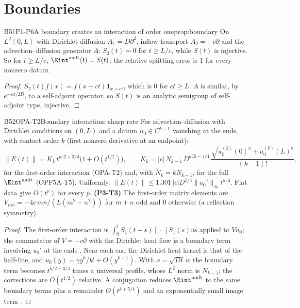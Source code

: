 \section{Boundaries}

\begin{dimcard}{B51}{P1-P6}{A boundary creates an interaction of order one}{\proved}{prop:boundary}
On $L^2(0,L)$ with Dirichlet diffusion $A_1=D\partial^2$, inflow transport $A_2=-c\partial$ and the advection--diffusion generator $A$: $S_2(t)=0$ for $t\ge L/c$, while $S(t)$ is injective. So for $t\ge L/c$, $\Eint^{\mathrm{mult}}(t)=S(t)$: the relative splitting error is $1$ for every nonzero datum.
\end{dimcard}
\begin{proof}
$S_2(t)f(x)=f(x-ct)\mathbf 1_{x>ct}$, which is $0$ for $ct\ge L$.
$A$ is similar, by $e^{-cx/2D}$, to a self-adjoint operator, so $S(t)$ is an analytic semigroup of self-adjoint type, injective.
\end{proof}

\begin{dimcard}{B52}{OPA-T2}{Boundary interaction: sharp rate}{\proved}{}
\label{dim:P3-T3}\label{dim:OPF5A-T5}%
For advection--diffusion with Dirichlet conditions on $(0,L)$ and a datum $u_0\in C^{k+1}$ vanishing at the ends, with contact order $k$ (first nonzero derivative at an endpoint):
\[
\|E(t)\|=K_k\,t^{k/2+3/4}\big(1+O(t^{1/2})\big),\qquad
K_k=|c|\,N_{k-1}\,D^{k/2-1/4}\,\frac{\sqrt{u_0^{(k)}(0)^2+u_0^{(k)}(L)^2}}{(k-1)!},
\]
for the first-order interaction (OPA-T2) and, with $\tilde N_k=kN_{k-1}$, for the full $\Eint^{\mathrm{mult}}$ (OPF5A-T5). Uniformly: $\|E(t)\|\le1.301\,|c|D^{1/4}\|u_0'\|_\infty t^{5/4}$. Flat data give $O(t^p)$ for every $p$. \textbf{(P3-T3)} The first-order matrix elements are $V_{mn}=-4c\,mn/(L(m^2-n^2))$ for $m+n$ odd and $0$ otherwise (a reflection symmetry).
\end{dimcard}
\begin{proof}
The first-order interaction is $\int_0^tS_1(t-s)[\,\cdot\,]S_1(s)\dd s$ applied to $Vu_0$; the commutator of $V=-c\partial$ with the Dirichlet heat flow is a boundary term involving $u_0'$ at the ends .
Near each end the Dirichlet heat kernel is that of the half-line, and $u_0(y)=\gamma y^k/k!+O(y^{k+1})$.
With $x=\sqrt{Dt}\,w$ the boundary term becomes $t^{k/2+3/4}$ times a universal profile, whose $L^2$ norm is $N_{k-1}$; the corrections are $O(t^{1/2})$ relative.
A conjugation reduces $\Eint^{\mathrm{mult}}$ to the same boundary terms plus a remainder $O(t^{k+5/4})$ and an exponentially small image term .
\end{proof}

